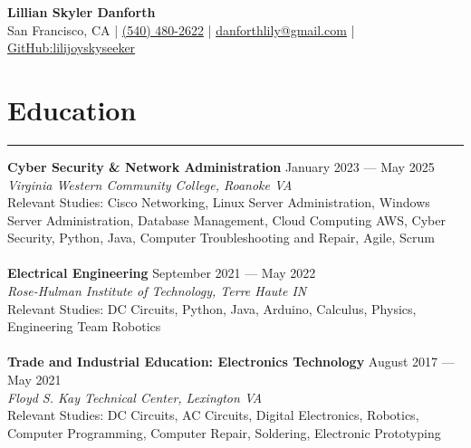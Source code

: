 \documentclass[a4paper,11pt]{article}
\begin{document}
\begin{center}
    {\LARGE \textbf{Lillian Skyler Danforth}} \\
    \vspace{0.2cm}
    \small
    San Francisco, CA | \href{tel:+15404802622}{(540) 480-2622} | \href{mailto:danforthlily@gmail.com}{danforthlily@gmail.com} | \href{https://github.com/lilijoyskyseeker}{GitHub:lilijoyskyseeker} \\
    \vspace{-0.4cm}
\end{center}
    
\section*{\hspace*{1em} Education}
\vspace{-0.2cm}
\hrule
\vspace{0.3cm}
\textbf{\hspace*{1em}Cyber Security \& Network Administration}
\hfill January 2023 — May 2025 \\
\textit{Virginia Western Community College, Roanoke VA} \\
Relevant Studies: Cisco Networking, Linux Server Administration, Windows Server Administration, Database Management, Cloud Computing AWS, Cyber Security, Python, Java, Computer Troubleshooting and Repair, Agile, Scrum \\
\vspace{-0.3cm} \\
\textbf{\hspace*{1em}Electrical Engineering}
\hfill September 2021 — May 2022 \\
\textit{Rose-Hulman Institute of Technology, Terre Haute IN} \\
Relevant Studies: DC Circuits, Python, Java, Arduino, Calculus, Physics, Engineering Team Robotics \\
\vspace{-0.3cm} \\
\textbf{\hspace*{1em}Trade and Industrial Education: Electronics Technology}
\hfill August 2017 — May 2021 \\
\textit{Floyd S. Kay Technical Center, Lexington VA} \\
Relevant Studies: DC Circuits, AC Circuits, Digital Electronics, Robotics, Computer Programming, Computer Repair, Soldering, Electronic Prototyping\\
\end{document}
